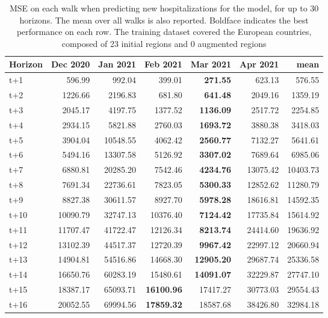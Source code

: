 \begin{table}[H]
\centering
\caption{MSE on each walk when predicting new hospitalizations for the model, for up to 30 horizons. The mean over all walks is also reported. Boldface indicates the best performance on each row. The training dataset covered the European countries, composed of 23 initial regions and 0 augmented regions }
\label{tab:MSE_walk_dense_model}
\begin{tabular}{lrrrrrr}
\toprule
Horizon &  Dec 2020 &  Jan 2021 &  Feb 2021 &  Mar 2021 &  Apr 2021 &     mean \\
\midrule
t+1  & 596.99  & 992.04  & 399.01  & \textbf{271.55}  & 623.13  & 576.55  \\
t+2  & 1226.66  & 2196.83  & 681.80  & \textbf{641.48}  & 2049.16  & 1359.19  \\
t+3  & 2045.17  & 4197.75  & 1377.52  & \textbf{1136.09}  & 2517.72  & 2254.85  \\
t+4  & 2934.15  & 5821.88  & 2760.03  & \textbf{1693.72}  & 3880.38  & 3418.03  \\
t+5  & 3904.04  & 10548.55  & 4062.42  & \textbf{2560.77}  & 7132.27  & 5641.61  \\
t+6  & 5494.16  & 13307.58  & 5126.92  & \textbf{3307.02}  & 7689.64  & 6985.06  \\
t+7  & 6880.81  & 20285.20  & 7542.46  & \textbf{4234.76}  & 13075.42  & 10403.73  \\
t+8  & 7691.34  & 22736.61  & 7823.05  & \textbf{5300.33}  & 12852.62  & 11280.79  \\
t+9  & 8827.38  & 30611.57  & 8927.70  & \textbf{5978.28}  & 18616.81  & 14592.35  \\
t+10  & 10090.79  & 32747.13  & 10376.40  & \textbf{7124.42}  & 17735.84  & 15614.92  \\
t+11  & 11707.47  & 41722.47  & 12126.34  & \textbf{8213.74}  & 24414.60  & 19636.92  \\
t+12  & 13102.39  & 44517.37  & 12720.39  & \textbf{9967.42}  & 22997.12  & 20660.94  \\
t+13  & 14904.81  & 54516.86  & 14668.30  & \textbf{12905.20}  & 29687.74  & 25336.58  \\
t+14  & 16650.76  & 60283.19  & 15480.61  & \textbf{14091.07}  & 32229.87  & 27747.10  \\
t+15  & 18387.17  & 65093.71  & \textbf{16100.96}  & 17417.27  & 30773.03  & 29554.43  \\
t+16  & 20052.55  & 69994.56  & \textbf{17859.32}  & 18587.68  & 38426.80  & 32984.18  \\

\end{tabular}
\end{table}
